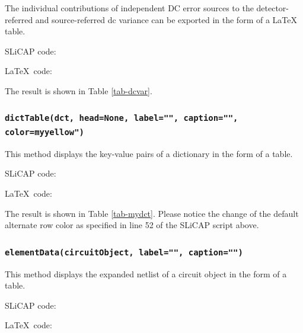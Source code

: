 \documentclass[a4paper,12pt]{article}
\begin{document}
The individual contributions of independent DC error sources to the detector-referred and source-referred dc variance can be exported in the form of a \LaTeX$\,$ table.

SLiCAP code:



\LaTeX$\,$ code:



The result is shown in Table \ref{tab-dcvar}.



\subsubsection{\texttt{dictTable(dct, head=None, label="", caption="", \\ color=myyellow")}}

This method displays the key-value pairs of a dictionary in the form of a table.

SLiCAP code:



\LaTeX$\,$ code:



The result is shown in Table \ref{tab-mydct}.  Please notice the change of the default alternate row color as specified in line 52 of the SLiCAP script above.



\subsubsection{\texttt{elementData(circuitObject, label="", caption="")}}

This method displays the expanded netlist of a circuit object in the form of a table.

SLiCAP code:



\LaTeX$\,$ code:


\end{document}
